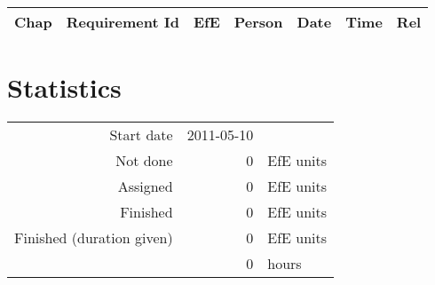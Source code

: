{\small \begin{longtable}{|c|p{5.5cm}||r|l|l|r|r|} \hline
\textbf{Chap} & \textbf{Requirement Id} & \textbf{EfE} & \textbf{Person} & \textbf{Date} & \textbf{Time} & \textbf{Rel} \\ \hline\endhead
\end{longtable}}\section{Statistics}
\begin{longtable}{rrl}
Start date & 2011-05-10 & \\ 
Not done & 0 & EfE units \\ 
Assigned & 0 & EfE units \\ 
Finished & 0 & EfE units \\ 
Finished (duration given) & 0 & EfE units \\ 
 & 0 & hours \\ 
\end{longtable}